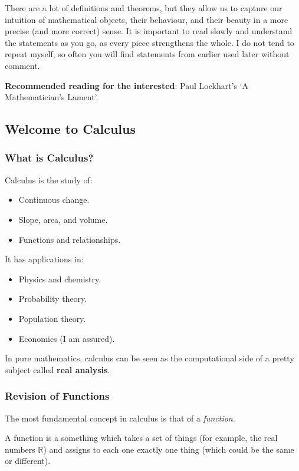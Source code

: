 There are a lot of definitions and theorems, but they allow us to capture our intuition of mathematical objects, their behaviour, and their beauty
in a more precise (and more correct) sense. It is important to read slowly and understand the statements as you go, as every piece strengthens the
whole. I do not tend to repeat myself, so often you will find statements from earlier used later without comment.

\textbf{Recommended reading for the interested}: Paul Lockhart's `A Mathematician's Lament'.

\clearpage
\subsection*{Welcome to Calculus}
\subsubsection* {What is Calculus?}
Calculus is the study of:
\begin{itemize}
  \item Continuous change.
  \item Slope, area, and volume.
  \item Functions and relationships.
\end{itemize}

It has applications in:
\begin{itemize}
  \item Physics and chemistry.
  \item Probability theory.
  \item Population theory.
  \item Economics (I am assured).
\end{itemize}

In pure mathematics, calculus can be seen as the computational side of a pretty
subject called \textbf{real analysis}.

\subsubsection*{Revision of Functions}
The most fundamental concept in calculus is that of a \textit{function}.

\begin{defn}[Function]
  A function is a something which takes a set of things (for example, the real numbers $ \mathbb{R} $) and assigns
  to each one exactly one thing (which could be the same or different).
\end{defn}

